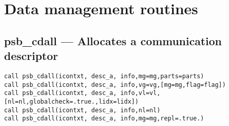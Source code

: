 \section{Data management routines}
\label{sec:toolsrout}


%
%
\subsection*{psb\_cdall --- Allocates a communication descriptor}

\begin{verbatim}
call psb_cdall(icontxt, desc_a, info,mg=mg,parts=parts)
call psb_cdall(icontxt, desc_a, info,vg=vg,[mg=mg,flag=flag])
call psb_cdall(icontxt, desc_a, info,vl=vl,[nl=nl,globalcheck=.true.,lidx=lidx])
call psb_cdall(icontxt, desc_a, info,nl=nl)
call psb_cdall(icontxt, desc_a, info,mg=mg,repl=.true.)
\end{verbatim}

